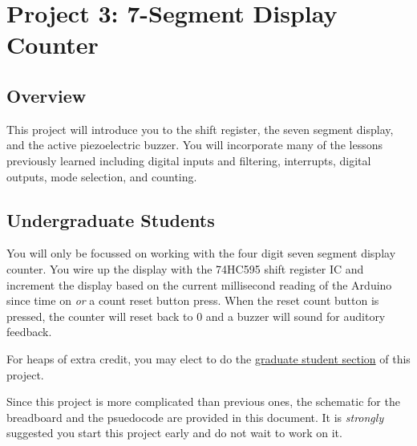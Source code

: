 %

\chapter{Project 3: 7-Segment Display Counter}

\section*{Overview}
This project will introduce you to the shift register, the seven segment display, and the active piezoelectric buzzer.
You will incorporate many of the lessons previously learned including digital inputs and filtering, interrupts, digital outputs, mode selection, and counting.

\section*{Undergraduate Students}
You will only be focussed on working with the four digit seven segment display counter.
You wire up the display with the 74HC595 shift register IC and increment the display based on the current millisecond reading of the Arduino since time on \emph{or} a count reset button press.
When the reset count button is pressed, the counter will reset back to 0 and a buzzer will sound for auditory feedback.


For heaps of extra credit, you may elect to do the \hyperref[sec:p3_grad_students]{graduate student section} of this project.

Since this project is more complicated than previous ones, the schematic for the breadboard and the psuedocode are provided in this document. It is \emph{strongly} suggested you start this project early and do not wait to work on it.

